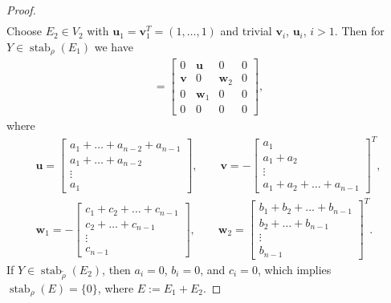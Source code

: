 \documentclass[pdftex]{sigma}
\numberwithin{equation}{section}
\begin{document}
\begin{proof}
\begin{gather*}
\end{gather*}
Choose $ E_2\in V_2$
with
$\mathbf{u}_1=\mathbf{v}_1^T=(1,\dots,1)$ and trivial $\mathbf{v}_i$, $\mathbf{u}_i$, $i>1$. Then for $Y \in \operatorname{stab}_{\rho}(E_1)$ we have
\begin{gather*} [E_2,Y]=
\left[
\begin{array}{c|c|c|c}
0 & \mathbf{u} & 0 & 0 \\ \hline
\mathbf{v} & 0 & \mathbf{w}_2 & 0 \\ \hline
0 & \mathbf{w}_1 & 0 & 0 \\ \hline
0 & 0 & 0 & 0
\end{array}
\right],\end{gather*}
where
\begin{gather*} \mathbf{u}=\left[\begin{array}{l}
a_{1}+\dots +a_{n-2} +a_{n-1}\\
a_{1}+\dots +a_{n-2}\\
\vdots \\
a_{1}
\end{array}\right]
,\qquad
\mathbf{v}=-\left[\begin{array}{l}
a_{1}\\
a_{1}+a_{2}\\
\vdots \\
a_{1}+a_{2}+\dots +a_{n-1}
\end{array}\right]^T
,\\
\mathbf{w}_1=-\left[\begin{array}{r}
c_{1}+c_{2}+\dots+c_{n-1}\\
c_{2}+\dots+c_{n-1}\\
\vdots\\
c_{n-1}
\end{array}\right], \qquad
\mathbf{w}_2=\left[\begin{array}{r}
b_{1}+b_2+\dots+b_{n-1}\\
b_{2}+\dots+b_{n-1}\\
 \vdots\\
b_{n-1}
\end{array}\right]^T.
\end{gather*}
If $Y\in\operatorname{stab}_{\tilde\rho}(E_2)$, then $a_i=0$, $b_i=0$, and $c_i=0$, which implies $\operatorname{stab}_{\rho}(E) =\{0\} $, where $E:=E_1+E_2$.


\end{proof}
\end{document}

